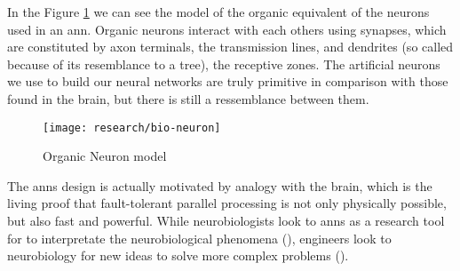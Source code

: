 In the Figure \ref{fig:org_neuron} we can see the model of the organic equivalent of the neurons used in an \gls{ann}. Organic neurons interact with each others using synapses, which are constituted by axon terminals, the transmission lines, and dendrites (so called because of its resemblance to a tree), the receptive zones. The artificial neurons we use to build our neural networks are truly primitive in comparison with those found in the brain, but there is still a ressemblance between them.

\begin{figure}[!ht]
	\centering
	\texttt{[image: research/bio-neuron]}
	\caption{Organic Neuron model}
	\label{fig:org_neuron}
\end{figure}

The \glspl{ann} design is actually motivated by analogy with the brain, which is the living proof that fault-tolerant parallel processing is not only physically possible, but also fast and powerful. While neurobiologists look to \glspl{ann} as a research tool for to interpretate the neurobiological phenomena (\cite{anastasio1993}), engineers look to neurobiology for new ideas to solve more complex problems (\cite{mead1989}).





